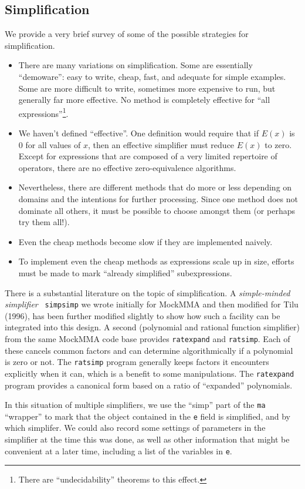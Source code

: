 \documentclass{article}
\begin{document}
{\subsection{Simplification}
We provide a very brief survey of some of the possible strategies for
simplification.
\begin{itemize}
\item There are many variations on simplification. Some are essentially
``demoware'': easy to write, cheap, fast, and adequate for simple examples.
Some are more difficult to write, sometimes more expensive
to run, but generally far more effective. No method
is completely effective for ``all expressions''\footnote{There are ``undecidability''
theorems
to this effect.}.
\item We haven't defined ``effective''. One definition would require
that if $E(x)$ is 0 for all values of $x$, then an effective
simplifier must reduce $E(x)$ to zero. Except for expressions that are composed
of a very limited repertoire of operators, there are no effective zero-equivalence
algorithms.
\item Nevertheless, there are different methods that do more or less
depending on domains and the intentions for further processing.
Since one method does not dominate all others, it must be possible
to choose amongst them (or perhaps try them all!).
\item Even the cheap methods become slow if they are implemented naively.
\item To implement even the cheap methods as expressions scale up
in size, efforts must be made to mark ``already simplified'' subexpressions.
\end{itemize}

There is a substantial literature on the topic of simplification.  
A {\em simple-minded simplifier} {\tt
simpsimp} we wrote initially for MockMMA and then modified for Tilu (1996),
has been further modified slightly to show how such a facility can be
integrated into this design. A second (polynomial and rational
function simplifier) from the same MockMMA code base provides {\tt ratexpand}
and {\tt ratsimp}. Each of these cancels common factors and
can determine algorithmically if a polynomial is zero or not.
The {\tt ratsimp} program generally keeps factors it encounters
explicitly when it can, which is a benefit to some manipulations. The {\tt ratexpand}
program provides a canonical form based on a ratio of ``expanded''
polynomials. 

In this situation of multiple simplifiers, we use the ``simp'' part of the
{\tt ma} ``wrapper'' to mark that the object contained in
the {\tt e} field is simplified, and by which simplifer.  We could
also record some settings
of parameters in the simplifier at the time this was
done, as well as other information that might be convenient at a later
time, including a list of the variables in {\tt e}.
}
\end{document}
